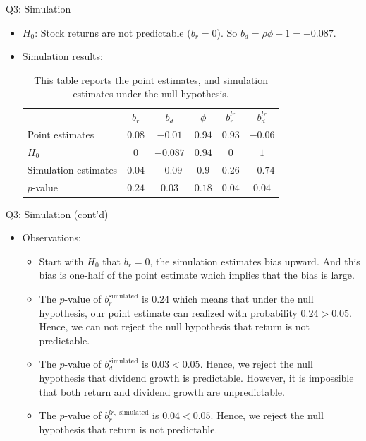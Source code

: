 \documentclass[10pt,t]{beamer}
\begin{document}
\begin{frame}{Q3: Simulation}
\begin{itemize}
  \item $H_0$: Stock returns are not predictable ($b_r = 0$). So $b_d = \rho \phi - 1 = -0.087$.
  \item Simulation results:
\begin{table}
\begin{tabular}{lccccc}
\toprule
& $b_r$ & $b_d$ & $\phi$ & $b_r^{lr}$ & $b_d^{lr}$ \\
\cmidrule{1-6}
Point estimates & $0.08$ & $-0.01$ & $0.94$ & $0.93$ & $-0.06$ \\
$H_0$ & $0$ & $-0.087$ & $0.94$ & $0$ & $1$\\
Simulation estimates & $0.04$ & $-0.09$ & $0.9$ & $0.26$ & $-0.74$\\
$p$-value & $0.24$ & $0.03$ & $0.18$ & $0.04$ & $0.04$ \\
\bottomrule
\end{tabular}
\caption{This table reports the point estimates, and simulation estimates under the null hypothesis.}
\end{table}
\end{itemize}
\end{frame}

\begin{frame}{Q3: Simulation (cont'd)}
\begin{itemize}
  \item Observations:
  \begin{itemize}
    \item Start with $H_0$ that $b_r = 0$, the simulation estimates bias upward. And this bias is one-half of the point estimate which implies that the bias is large.
    \item The $p$-value of $b_r^{\text{simulated}}$ is $0.24$ which means that under the null hypothesis, our point estimate can realized with probability $0.24>0.05$. Hence, we can not reject the null hypothesis that return is not predictable.
    \item The $p$-value of $b_d^{\text{simulated}}$ is $0.03 < 0.05$. Hence, we reject the null hypothesis that dividend growth is predictable. However, it is impossible that both return and dividend growth are unpredictable.
    \item The $p$-value of $b_r^{lr,\text{ simulated}}$ is $0.04 < 0.05$. Hence, we reject the null hypothesis that return is not predictable.
  \end{itemize}
\end{itemize}
\end{frame}
\end{document}
